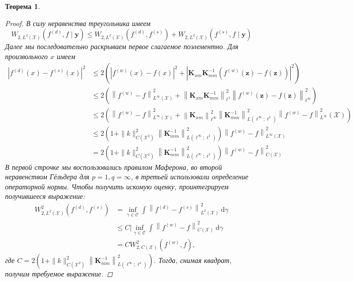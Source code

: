 \documentclass[12pt, twoside]{article}
\newtheorem{theorem}{Теорема}
\begin{document}
\begin{theorem}
\begin{proof}
В силу неравенства треугольника имеем 
\begin{equation}
W_{2, L^{2}(\mathcal{X})}\left(f^{(d)}, f \mid \boldsymbol{y}\right) \leq W_{2, L^{2}(\mathcal{X})}\left(f^{(d)}, f^{(s)}\right)+W_{2, L^{2}(\mathcal{X})}\left(f^{(s)}, f \mid \boldsymbol{y}\right)
\end{equation}
Далее мы последовательно раскрываем первое слагаемое поэлементно. Для произвольного $x$ имеем
\begin{equation}
\begin{aligned}
\left|f^{(d)}(x)-f^{(s)}(x)\right|^{2} & \leq 2\left(\left|f^{(w)}(x)-f(x)\right|^{2}+\left|\mathbf{K}_{x m} \mathbf{K}_{m m}^{-1}\left(f^{(w)}(\boldsymbol{z})-f(\boldsymbol{z})\right)\right|^{2}\right) \\
& \leq 2\left(\left\|f^{(w)}-f\right\|_{L^{\infty}(\mathcal{X})}^{2}+\left\|\mathbf{K}_{x m} \mathbf{K}_{m m}^{-1}\right\|_{\ell^{1}}^{2}\left\|f^{(w)}(\boldsymbol{z})-f(\boldsymbol{z})\right\|_{\ell^{\infty}}^{2}\right) \\
& \leq 2\left(\left\|f^{(w)}-f\right\|_{L^{\infty}(\mathcal{X})}^{2}+\left\|\mathbf{K}_{x m}\right\|_{\ell^{\infty}}^{2}\left\|\mathbf{K}_{m m}^{-1}\right\|_{L\left(\ell^{\infty} ; \ell^{1}\right)}^{2}\left\|f^{(w)}-f\right\|_{L^{\infty}}^{2}(\mathcal{X})\right) \\
& \leq 2\left(1+\|k\|_{C\left(\mathcal{X}^{2}\right)}^{2}\left\|\mathbf{K}_{m m}^{-1}\right\|_{L\left(\ell^{\infty} ; \ell^{1}\right)}^{2}\right)\left\|f^{(w)}-f\right\|_{L^{\infty}(\mathcal{X})}^{2} \\
&=2\left(1+\|k\|_{C\left(\mathcal{X}^{2}\right)}^{2}\left\|\mathbf{K}_{m m}^{-1}\right\|_{L\left(\ell^{\infty} ; \ell^{1}\right)}^{2}\right)\left\|f^{(w)}-f\right\|_{C(\mathcal{X})}^{2}
\end{aligned}
\end{equation}
В первой строчке мы воспользовались правилом Маферона, во второй неравенством Гёльдера для $p=1, q=\infty $, в третьей использовали определение операторной нормы. Чтобы получить искомую оценку, проинтегрируем получившееся выражение:
\begin{equation}
\begin{aligned}
W_{2, L^{2}(\mathcal{X})}^{2}\left(f^{(d)}, f^{(s)}\right) & = \inf _{\gamma \in \mathcal{C}} \int\left\|f^{(d)}-f^{(s)}\right\|_{L^{2}(\mathcal{X})}^{2} \mathrm{~d} \gamma \\
& \leq C| \inf _{\gamma \in \mathcal{C}} \int\left\|f^{(w)}-f\right\|_{C(\mathcal{X})}^{2} \mathrm{~d} \gamma \\
&=C  W_{2, C(\mathcal{X})}^{2}\left(f^{(w)}, f\right),
\end{aligned}
\end{equation}
где $C = 2\left(1+\|k\|_{C\left(\mathcal{X}^{2}\right)}^{2}\left\|\mathbf{K}_{m m}^{-1}\right\|_{L\left(\ell^{\infty} ; \ell^{1}\right)}^{2}\right)$. Тогда, снимая квадрат, получим требуемое выражение.
\end{proof}
\end{theorem}
\end{document}
